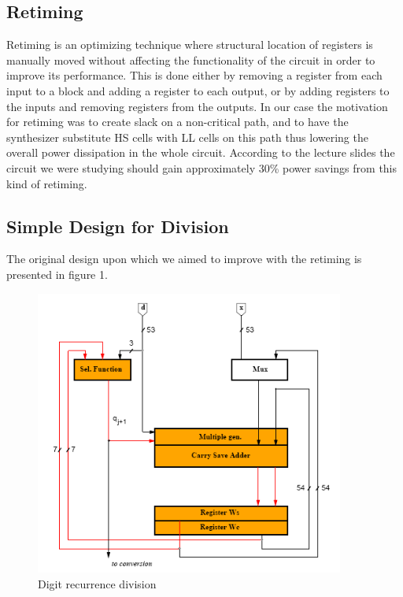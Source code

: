 \documentclass[11pt,a4paper]{article}
\begin{document}
\subsection{Retiming}
Retiming is an optimizing technique where structural location of registers is manually moved without affecting the functionality of the circuit in order to improve its performance. This is done either by removing a register from each input to a block and adding a register to each output, or by adding registers to the inputs and removing registers from the outputs.
In our case the motivation for retiming was to create slack on a non-critical path, and to have the synthesizer substitute HS cells with LL cells on this path thus lowering the overall power dissipation in the whole circuit. According to the lecture slides the circuit we were studying should gain approximately 30\% power savings from this kind of retiming.

\subsection{Simple Design for Division}
The original design upon which we aimed to improve with the retiming is presented in figure 1.

\begin{figure}
	\centering
		\includegraphics[width=4in]{./noretiming.PNG}
	\caption{Digit recurrence division}
	\label{fig:noretiming}
\end{figure}
\end{document}
